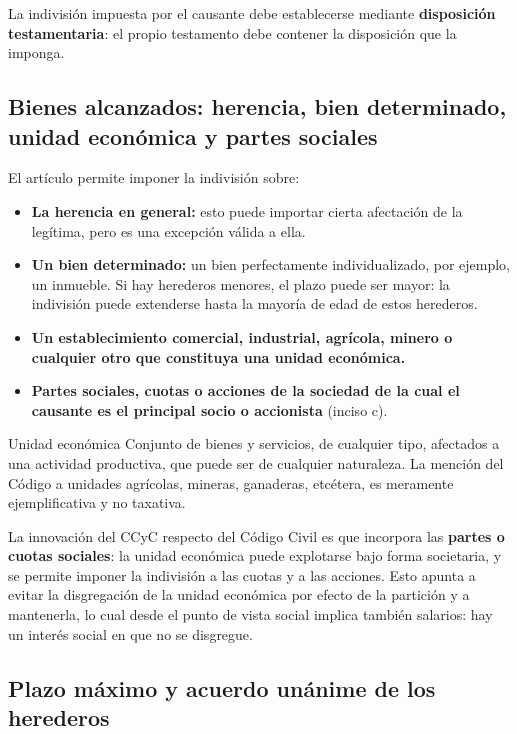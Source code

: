 \documentclass[12pt,oneside]{book}
\begin{document}
La indivisión impuesta por el causante debe establecerse mediante \textbf{disposición testamentaria}: el propio testamento debe contener la disposición que la imponga.

\subsection{Bienes alcanzados: herencia, bien determinado, unidad económica y partes sociales}

El artículo permite imponer la indivisión sobre:

\begin{itemize}
    \item \textbf{La herencia en general:} esto puede importar cierta afectación de la legítima, pero es una excepción válida a ella.
    \item \textbf{Un bien determinado:} un bien perfectamente individualizado, por ejemplo, un inmueble. Si hay herederos menores, el plazo puede ser mayor: la indivisión puede extenderse hasta la mayoría de edad de estos herederos.
    \item \textbf{Un establecimiento comercial, industrial, agrícola, minero o cualquier otro que constituya una unidad económica.}
    \item \textbf{Partes sociales, cuotas o acciones de la sociedad de la cual el causante es el principal socio o accionista} (inciso c).
\end{itemize}

\begin{definition}{Unidad económica}
Conjunto de bienes y servicios, de cualquier tipo, afectados a una actividad productiva, que puede ser de cualquier naturaleza. La mención del Código a unidades agrícolas, mineras, ganaderas, etcétera, es meramente ejemplificativa y no taxativa.
\end{definition}

La innovación del CCyC respecto del Código Civil es que incorpora las \textbf{partes o cuotas sociales}: la unidad económica puede explotarse bajo forma societaria, y se permite imponer la indivisión a las cuotas y a las acciones. Esto apunta a evitar la disgregación de la unidad económica por efecto de la partición y a mantenerla, lo cual desde el punto de vista social implica también salarios: hay un interés social en que no se disgregue.

\subsection{Plazo máximo y acuerdo unánime de los herederos}
\end{document}
